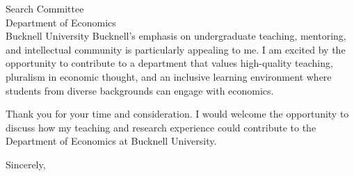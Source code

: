 \documentclass[11pt]{letter}
\begin{document}
\begin{letter}{Search Committee \\
Department of Economics \\
Bucknell University}
Bucknell’s emphasis on undergraduate teaching, mentoring, and intellectual community is particularly appealing to me. I am excited by the opportunity to contribute to a department that values high-quality teaching, pluralism in economic thought, and an inclusive learning environment where students from diverse backgrounds can engage with economics.

Thank you for your time and consideration. I would welcome the opportunity to discuss how my teaching and research experience could contribute to the Department of Economics at Bucknell University.

\closing{Sincerely,}

\end{letter}
\end{document}
